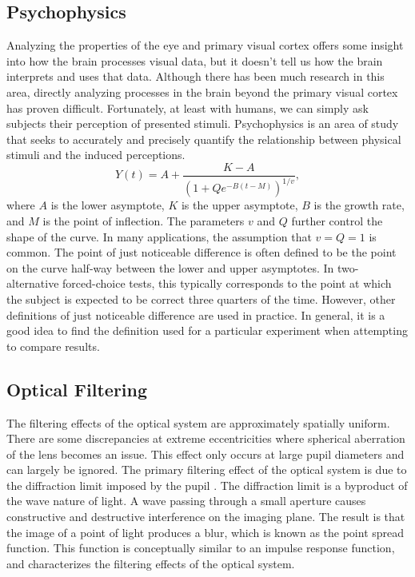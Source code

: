 \documentclass{article}
\begin{document}
\subsection{Psychophysics}
Analyzing the properties of the eye and primary visual cortex offers some insight into how the brain processes visual data, but it doesn't tell us how the brain interprets and uses that data.
Although there has been much research in this area, directly analyzing processes in the brain beyond the primary visual cortex has proven difficult.
Fortunately, at least with humans, we can simply ask subjects their perception of presented stimuli.
Psychophysics is an area of study that seeks to accurately and precisely quantify the relationship between physical stimuli and the induced perceptions.
\begin{equation}
Y(t) = A + \frac{K - A}{ \left( 1 + Q e^{ -B ( t - M ) } \right)^{1/v} },
\end{equation}
where $A$ is the lower asymptote, $K$ is the upper asymptote, $B$ is the growth rate, and $M$ is the point of inflection.
The parameters $v$ and $Q$ further control the shape of the curve.
In many applications, the assumption that $v=Q=1$ is common. 
The point of just noticeable difference is often defined to be the point on the curve half-way between the lower and upper asymptotes.
In two-alternative forced-choice tests, this typically corresponds to the point at which the subject is expected to be correct three quarters of the time.
However, other definitions of just noticeable difference are used in practice.
In general, it is a good idea to find the definition used for a particular experiment when attempting to compare results.

\subsection{Optical Filtering}
The filtering effects of the optical system are approximately spatially uniform.
There are some discrepancies at extreme eccentricities where spherical aberration of the lens becomes an issue.
This effect only occurs at large pupil diameters and can largely be ignored.
The primary filtering effect of the optical system is due to the diffraction limit imposed by the pupil \cite{Hecht2001}.
The diffraction limit is a byproduct of the wave nature of light.
A wave passing through a small aperture causes constructive and destructive interference on the imaging plane.
The result is that the image of a point of light produces a blur, which is known as the point spread function.
This function is conceptually similar to an impulse response function, and characterizes the filtering effects of the optical system.
\end{document}
